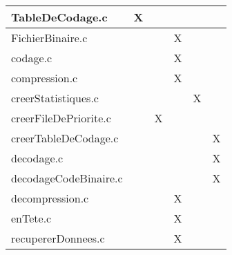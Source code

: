 \begin{table}[h]
\begin{tabular}{l|c|c|c|c|c|}
\multicolumn{1}{|l|}{TableDeCodage.c}                        & X                     &                &                       &                       &                        \\ \hline
\multicolumn{1}{|l|}{FichierBinaire.c}                        &                      &                & X                    &                       &                        \\ \hline
\multicolumn{1}{|l|}{codage.c}                        &                      &                & X                     &                       &                        \\ \hline
\multicolumn{1}{|l|}{compression.c}                        &                      &                & X                      &                       &                        \\ \hline
\multicolumn{1}{|l|}{creerStatistiques.c}                        &                      &                &                       & X                       &                        \\ \hline
\multicolumn{1}{|l|}{creerFileDePriorite.c}                        &                     & X               &                       &                       &                        \\ \hline
\multicolumn{1}{|l|}{creerTableDeCodage.c}                        &                      &                &                       &                       & X                       \\ \hline
\multicolumn{1}{|l|}{decodage.c}                        &                      &                &                       &                       & X                       \\ \hline
\multicolumn{1}{|l|}{decodageCodeBinaire.c}                            &                       &               &                       &                       & X                      \\ \hline
\multicolumn{1}{|l|}{decompression.c}                           &                       &               & X                      &                       &                        \\ \hline
\multicolumn{1}{|l|}{enTete.c}                         &                       &                & X                     &                       &                        \\ \hline
\multicolumn{1}{|l|}{recupererDonnees.c}              &                      &                & X                      &                       &                        \\ \hline

\end{tabular}
\end{table}
